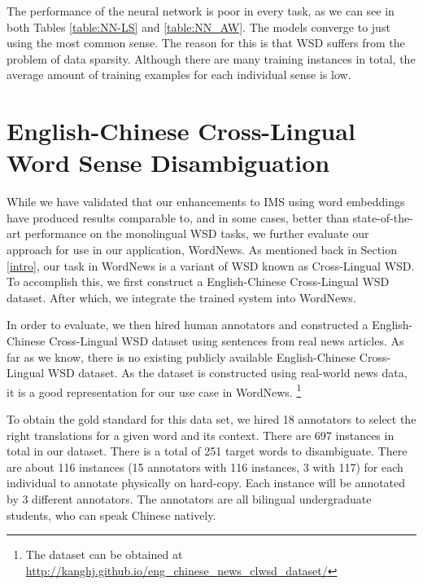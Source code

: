 \documentclass[11pt]{article}
\begin{document}
The performance of the neural network is poor in every task, as we can see in both Tables \ref{table:NN-LS} and \ref{table:NN_AW}. The models converge to just using the most common sense. The reason for this is that WSD suffers from the problem of data sparsity. Although there are many training instances in total, the average amount of training examples for each individual sense is low. 

\fi

\section{English-Chinese Cross-Lingual Word Sense Disambiguation}
\label{section:CLWSD}



While we have validated that our enhancements to IMS using word embeddings have produced results comparable to, and in some cases, better than state-of-the-art performance on the monolingual WSD tasks, we further evaluate our approach for use in our application, WordNews. As mentioned back in Section \ref{intro}, our task in WordNews is a variant of WSD known as Cross-Lingual WSD. To accomplish this, we first construct a English-Chinese Cross-Lingual WSD dataset. After which, we integrate the trained system into WordNews. 

In order to evaluate, we then hired human annotators and constructed a English-Chinese Cross-Lingual WSD dataset using sentences from real news articles. As far as we know, there is no existing publicly available English-Chinese Cross-Lingual WSD dataset. As the dataset is constructed using real-world news data, it is a good representation for our use case in WordNews. {\footnote{The dataset can be obtained at {\url{  http://kanghj.github.io/eng_chinese_news_clwsd_dataset/}}}}

To obtain the gold standard for this data set, we hired 18 annotators to select the right translations for a given word and its context. There are 697 instances in total in our dataset. There is a total of 251 target words to disambiguate. There are about 116 instances (15 annotators with 116 instances, 3 with 117) for each individual to annotate physically on hard-copy. Each instance will be annotated by 3 different annotators. The annotators are all bilingual undergraduate students, who can speak Chinese natively. 
\end{document}
